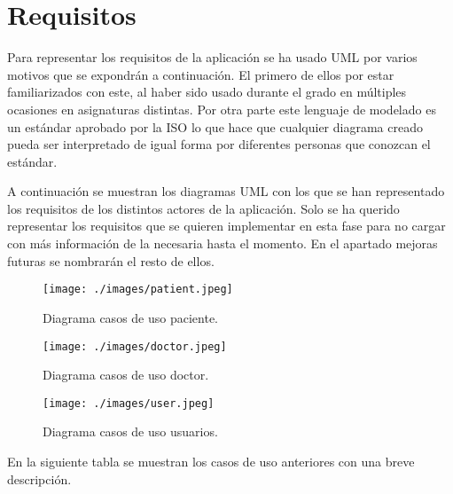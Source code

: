 \section{Requisitos}
Para representar los requisitos de la aplicación se ha usado UML\cite{uml} por varios
motivos que se expondrán a continuación. El primero de ellos por estar familiarizados
con este, al haber sido usado durante el grado en múltiples ocasiones en asignaturas
distintas. Por otra parte este lenguaje de modelado es un estándar aprobado por la ISO
lo que hace que cualquier diagrama creado pueda ser interpretado de igual forma por
diferentes personas que conozcan el estándar.

\medskip
A continuación se muestran los diagramas UML con los que se han representado los
requisitos de los distintos actores de la aplicación. Solo se ha querido representar los
requisitos que se quieren implementar en esta fase para no cargar con más información de
la necesaria hasta el momento. En el apartado mejoras futuras se nombrarán el resto de ellos.

\medskip
\begin{figure}
    \texttt{[image: ./images/patient.jpeg]}
    \caption{Diagrama casos de uso paciente.}
    \label{Diagrama casos de uso paciente.}
\end{figure}

\medskip
\begin{figure}
    \texttt{[image: ./images/doctor.jpeg]}
    \caption{Diagrama casos de uso doctor.}
    \label{Diagrama casos de uso doctor.}
\end{figure}

\medskip
\begin{figure}
    \texttt{[image: ./images/user.jpeg]}
    \caption{Diagrama casos de uso usuarios.}
    \label{Diagrama casos de uso usuarios.}
\end{figure}

\medskip
En la siguiente tabla se muestran los casos de uso anteriores con una breve descripción.

